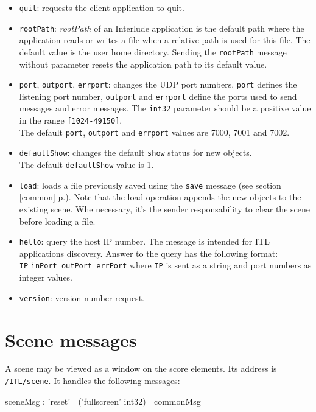 \documentclass[a4paper,twoside]{report}
\newcommand{\toplevel}[1]	{\chapter{#1}}
\newcommand{\fullref}[1]	{\ref{#1} p.\pageref{#1}}
\newcommand{\OSC}[1]		{\texttt{#1}}
\newcommand{\values}[1]	{\texttt{#1}}
\newcommand{\example}		{\hspace*{1cm}}
\begin{document}
\begin{itemize}
\item \OSC{quit}: requests the client application to quit.

\item \OSC{rootPath}: \emph{rootPath} of an Interlude application is the default path where the application reads or writes a file when a relative path is used for this file. The default value is the user home directory. Sending the \OSC{rootPath} message without parameter resets the application path to its default value.

\item \OSC{port}, \OSC{outport}, \OSC{errport}: changes the UDP port numbers. \OSC{port} defines the listening port number, \OSC{outport} and \OSC{errport} define the ports used to send messages and error messages. The \OSC{int32} parameter should be a positive value in the range \values{[1024-49150]}. \\
The default \OSC{port}, \OSC{outport} and \OSC{errport} values are 7000, 7001 and 7002.

\item \OSC{defaultShow}: changes the default \OSC{show} status for new objects. \\
The default \OSC{defaultShow} value is 1.

\item \OSC{load}: loads a file previously saved using the \OSC{save} message (see section \fullref{common}). Note that the load operation appends the new objects to the existing scene. Whe necessary, it's the sender responsability to clear the scene before loading a file.

\item \OSC{hello}: query the host IP number. The message is intended for ITL applications discovery. Answer to the query has the following format: \\
\example \OSC{IP} \OSC{inPort outPort errPort} where \OSC{IP} is sent as a string and port numbers as integer values.

\item \OSC{version}: version number request.
\end{itemize}

\toplevel{Scene messages}
\label{scene}
A scene may be viewed as a window on the score elements. Its address is \OSC{/ITL/scene}. It handles the following messages:
\begin{rail}
sceneMsg : 'reset'
			| ('fullscreen' int32)
			| commonMsg
\end{rail}
\end{document}
